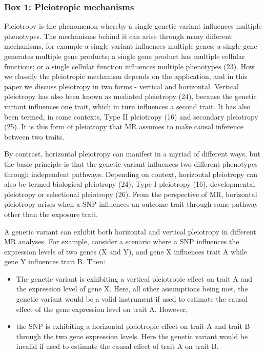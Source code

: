 \documentclass[]{article}
\providecommand{\tightlist}{%
  \setlength{\itemsep}{0pt}\setlength{\parskip}{0pt}}
\begin{document}
\subsubsection{Box 1: Pleiotropic
mechanisms}\label{box-1-pleiotropic-mechanisms}

Pleiotropy is the phenomenon whereby a single genetic variant influences
multiple phenotypes. The mechanisms behind it can arise through many
different mechanisms, for example a single variant influences multiple
genes; a single gene generates multiple gene products; a single gene
product has multiple cellular functions; or a single cellular function
influences multiple phenotypes (23). How we classify the pleiotropic
mechanism depends on the application, and in this paper we discuss
pleiotropy in two forms - vertical and horizontal. Vertical pleiotropy
has also been known as mediated pleiotropy (24), because the genetic
variant influences one trait, which in turn influences a second trait.
It has also been termed, in some contexts, Type II pleiotropy (16) and
secondary pleiotropy (25). It is this form of pleiotropy that MR assumes
to make causal inference between two traits.

By contrast, horizontal pleiotropy can manifest in a myriad of different
ways, but the basic principle is that the genetic variant influences two
different phenotypes through independent pathways. Depending on context,
horizontal pleiotropy can also be termed biological pleiotropy (24),
Type I pleiotropy (16), developmental pleiotropy or selectional
pleiotropy (26). From the perspective of MR, horizontal pleiotropy
arises when a SNP influences an outcome trait through some pathway other
than the exposure trait.

A genetic variant can exhibit both horizontal and vertical pleiotropy in
different MR analyses. For example, consider a scenario where a SNP
influences the expression levels of two genes (X and Y), and gene X
influences trait A while gene Y influences trait B. Then:

\begin{itemize}
\tightlist
\item
  The genetic variant is exhibiting a vertical pleiotropic effect on
  trait A and the expression level of gene X. Here, all other
  assumptions being met, the genetic variant would be a valid instrument
  if used to estimate the causal effect of the gene expression level on
  trait A. However,
\item
  the SNP is exhibiting a horizontal pleiotropic effect on trait A and
  trait B through the two gene expression levels. Here the genetic
  variant would be invalid if used to estimate the causal effect of
  trait A on trait B.
\end{itemize}
\end{document}
